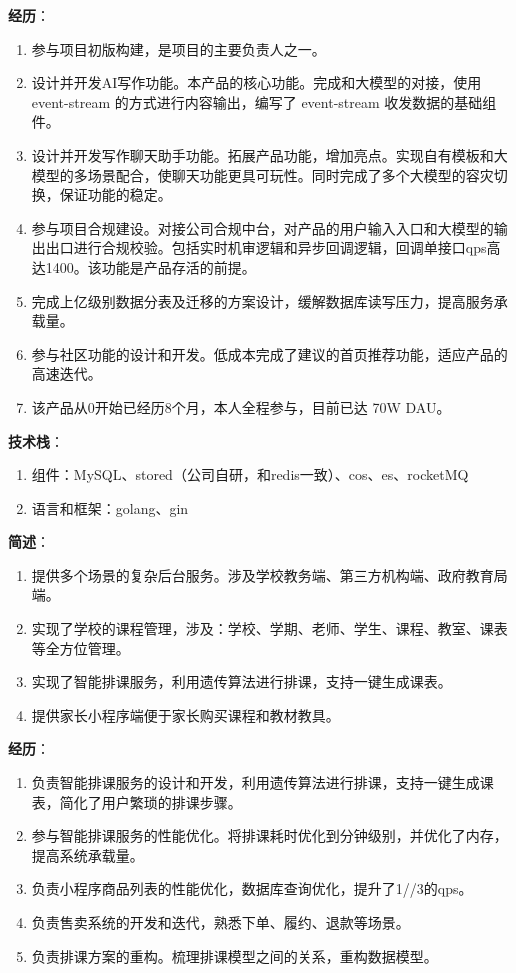 \documentclass{resume}
\begin{document}
\textbf{经历}：
\begin{enumerate}[parsep=0.5ex]
  \item 参与项目初版构建，是项目的主要负责人之一。
  \item 设计并开发AI写作功能。本产品的核心功能。完成和大模型的对接，使用 event-stream 的方式进行内容输出，编写了 event-stream 收发数据的基础组件。
  \item 设计并开发写作聊天助手功能。拓展产品功能，增加亮点。实现自有模板和大模型的多场景配合，使聊天功能更具可玩性。同时完成了多个大模型的容灾切换，保证功能的稳定。
  \item 参与项目合规建设。对接公司合规中台，对产品的用户输入入口和大模型的输出出口进行合规校验。包括实时机审逻辑和异步回调逻辑，回调单接口qps高达1400。该功能是产品存活的前提。
  \item 完成上亿级别数据分表及迁移的方案设计，缓解数据库读写压力，提高服务承载量。
  \item 参与社区功能的设计和开发。低成本完成了建议的首页推荐功能，适应产品的高速迭代。
  \item 该产品从0开始已经历8个月，本人全程参与，目前已达 70W DAU。
\end{enumerate}

\textbf{技术栈}：
\begin{enumerate}[parsep=0.5ex]
  \item 组件：MySQL、stored（公司自研，和redis一致）、cos、es、rocketMQ
  \item 语言和框架：golang、gin
\end{enumerate}


\textbf{简述}：
\begin{enumerate}[parsep=0.5ex]
  \item 提供多个场景的复杂后台服务。涉及学校教务端、第三方机构端、政府教育局端。
  \item 实现了学校的课程管理，涉及：学校、学期、老师、学生、课程、教室、课表等全方位管理。
  \item 实现了智能排课服务，利用遗传算法进行排课，支持一键生成课表。
  \item 提供家长小程序端便于家长购买课程和教材教具。
\end{enumerate}

\textbf{经历}：
\begin{enumerate}[parsep=0.5ex]
  \item 负责智能排课服务的设计和开发，利用遗传算法进行排课，支持一键生成课表，简化了用户繁琐的排课步骤。
  \item 参与智能排课服务的性能优化。将排课耗时优化到分钟级别，并优化了内存，提高系统承载量。
  \item 负责小程序商品列表的性能优化，数据库查询优化，提升了1//3的qps。
  \item 负责售卖系统的开发和迭代，熟悉下单、履约、退款等场景。
  \item 负责排课方案的重构。梳理排课模型之间的关系，重构数据模型。
\end{enumerate}
\end{document}
